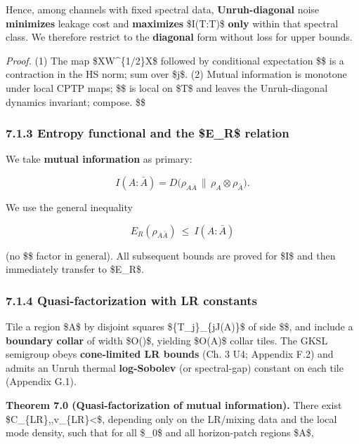 \documentclass[
]{article}
\numberwithin{equation}{section}
\begin{document}
Hence, among channels with fixed spectral data, \textbf{Unruh-diagonal}
noise \textbf{minimizes} leakage cost and \textbf{maximizes}
\$I(T:\overline T)\$ \textbf{only} within that spectral class. We
therefore restrict to the \textbf{diagonal} form without loss for upper
bounds.

\emph{Proof.} (1) The map \$X\mapsto W\^{}\{1/2\}X\$ followed by
conditional expectation \$\Delta\$ is a contraction in the HS norm; sum
over \$j\$. (2) Mutual information is monotone under local CPTP maps;
\$\Delta\$ is local on \$T\$ and leaves the Unruh-diagonal dynamics
invariant; compose. \$\square\$

\hypertarget{entropy-functional-and-the-e_r-relation}{%
\subsubsection{7.1.3 Entropy functional and the \$E\_R\$
relation}\label{entropy-functional-and-the-e_r-relation}}

We take \textbf{mutual information} as primary:

\[
I(A:\bar A)=D\big(\rho_{A\bar A}\,\big\|\,\rho_A\otimes\rho_{\bar A}\big).
\]

We use the general inequality

\[
\boxed{\,E_R(\rho_{A\bar A})\ \le\ I(A:\bar A)\,}
\]

(no \$\$ factor in general). All subsequent bounds are proved
for \$I\$ and then immediately transfer to \$E\_R\$.

\hypertarget{quasi-factorization-with-lr-constants}{%
\subsubsection{7.1.4 Quasi-factorization with LR
constants}\label{quasi-factorization-with-lr-constants}}

Tile a region \$A\$ by disjoint squares \$\{T\_j\}\_\{j\in J(A)\}\$ of
side \$\ell\$, and include a \textbf{boundary collar} of width
\$O(\ell)\$, yielding \$O(\textbar{}\partial A\textbar)\$ collar tiles.
The GKSL semigroup obeys \textbf{cone-limited LR bounds} (Ch. 3 U4;
Appendix F.2) and admits an Unruh thermal \textbf{log-Sobolev} (or
spectral-gap) constant on each tile (Appendix G.1).

\textbf{Theorem 7.0 (Quasi-factorization of mutual information).} There
exist \$C\_\{\rm LR\},\xi,v\_\{\rm LR\}\textless{}\infty\$, depending
only on the LR/mixing data and the local mode density, such that for all
\$\ell\ge \ell\_0\$ and all horizon-patch regions \$A\$,
\end{document}
